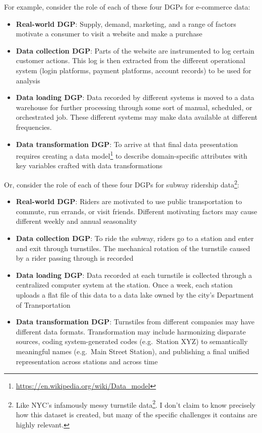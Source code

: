 \documentclass[
]{krantz}
\providecommand{\tightlist}{%
  \setlength{\itemsep}{0pt}\setlength{\parskip}{0pt}}
\renewcommand{\href}[2]{#2\footnote{\url{#1}}}
\begin{document}
For example, consider the role of each of these four DGPs for e-commerce data:

\begin{itemize}
\tightlist
\item
  \textbf{Real-world DGP}: Supply, demand, marketing, and a range of factors motivate a consumer to visit a website and make a purchase
\item
  \textbf{Data collection DGP}: Parts of the website are instrumented to log certain customer actions. This log is then extracted from the different operational system (login platforms, payment platforms, account records) to be used for analysis
\item
  \textbf{Data loading DGP}: Data recorded by different systems is moved to a data warehouse for further processing through some sort of manual, scheduled, or orchestrated job. These different systems may make data available at different frequencies.
\item
  \textbf{Data transformation DGP}: To arrive at that final data presentation requires creating a \href{https://en.wikipedia.org/wiki/Data_model}{data model} to describe domain-specific attributes with key variables crafted with data transformations
\end{itemize}

Or, consider the role of each of these four DGPs for subway ridership data\footnote{Like NYC's infamously messy \href{http://web.mta.info/developers/turnstile.html}{turnstile data}. I don't claim to know precisely how this dataset is created, but many of the specific challenges it contains are highly relevant.}:

\begin{itemize}
\tightlist
\item
  \textbf{Real-world DGP}: Riders are motivated to use public transportation to commute, run errands, or visit friends. Different motivating factors may cause different weekly and annual seasonality
\item
  \textbf{Data collection DGP}: To ride the subway, riders go to a station and enter and exit through turnstiles. The mechanical rotation of the turnstile caused by a rider passing through is recorded
\item
  \textbf{Data loading DGP}: Data recorded at each turnstile is collected through a centralized computer system at the station. Once a week, each station uploads a flat file of this data to a data lake owned by the city's Department of Transportation
\item
  \textbf{Data transformation DGP}: Turnstiles from different companies may have different data formats. Transformation may include harmonizing disparate sources, coding system-generated codes (e.g.~Station XYZ) to semantically meaningful names (e.g.~Main Street Station), and publishing a final unified representation across stations and across time
\end{itemize}
\end{document}

